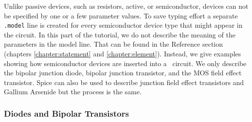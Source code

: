 Unlike passive devices, such as resistors, active, or semiconductor,
devices can not be specified by one or a few parameter values.
To save typing effort a separate {\tt .model} line is created for
every semiconductor device type that might appear in the circuit.
In this part of the tutorial, we do not describe the meaning
of the parameters in the model line.  That can be found in the Reference
section
(chapters \ref{chapter:statement} and \ref{chapter:element}).
Instead, we give examples showing how semiconductor devices
are inserted into a \spice\ circuit.
We only describe the bipolar junction diode, bipolar junction transistor,
and the MOS field effect transistor.  Spice can also be used to describe
junction field effect transistors and Gallium Arsenide but the process is the
same.

\subsubsection{Diodes and Bipolar Transistors}

